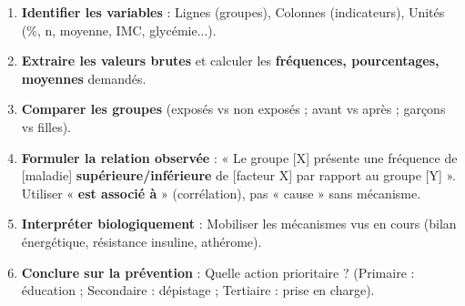 \documentclass[11pt]{article}
\begin{document}
\begin{methode}
\begin{enumerate}
\item \textbf{Identifier les variables} : Lignes (groupes), Colonnes (indicateurs), Unités (\%, n, moyenne, IMC, glycémie...).
\item \textbf{Extraire les valeurs brutes} et calculer les \textbf{fréquences, pourcentages, moyennes} demandés.
\item \textbf{Comparer les groupes} (exposés vs non exposés ; avant vs après ; garçons vs filles).
\item \textbf{Formuler la relation observée} : « Le groupe [X] présente une fréquence de [maladie] \textbf{supérieure/inférieure} de [facteur X] par rapport au groupe [Y] ». Utiliser « \textbf{est associé à} » (corrélation), pas « cause » sans mécanisme.
\item \textbf{Interpréter biologiquement} : Mobiliser les mécanismes vus en cours (bilan énergétique, résistance insuline, athérome).
\item \textbf{Conclure sur la prévention} : Quelle action prioritaire ? (Primaire : éducation ; Secondaire : dépistage ; Tertiaire : prise en charge).
\end{enumerate}
\end{methode}
\end{document}
